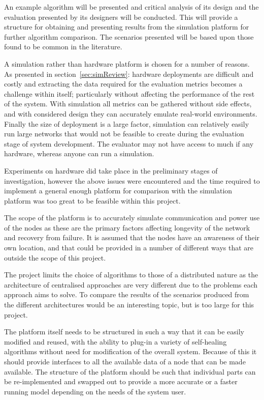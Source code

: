 \documentclass[authoryearcitations]{UoYCSproject}
\begin{document}
An example algorithm will be presented and critical analysis of its design and the evaluation presented by its designers will be conducted. This will provide a structure for obtaining and presenting results from the simulation platform for further algorithm comparison. The scenarios presented will be based upon those found to be common in the literature.

A simulation rather than hardware platform is chosen for a number of reasons. As presented in section~\ref{sec:simReview}: hardware deployments are difficult and costly and extracting the data required for the evaluation metrics becomes a challenge within itself; particularly without affecting the performance of the rest of the system. With simulation all metrics can be gathered without side effects, and with considered design they can accurately emulate real-world environments. Finally the size of deployment is a large factor, simulation can relatively easily run large networks that would not be feasible to create during the evaluation stage of system development. The evaluator may not have access to much if any hardware, whereas anyone can run a simulation.

Experiments on hardware did take place in the preliminary stages of investigation, however the above issues were encountered and the time required to implement a general enough platform for comparison with the simulation platform was too great to be feasible within this project.

The scope of the platform is to accurately simulate communication and power use of the nodes as these are the primary factors affecting longevity of the network and recovery from failure. It is assumed that the nodes have an awareness of their own location, and that could be provided in a number of different ways that are outside the scope of this project.

The project limits the choice of algorithms to those of a distributed nature as the architecture of centralised approaches are very different due to the problems each approach aims to solve. To compare the results of the scenarios produced from the different architectures would be an interesting topic, but is too large for this project.

The platform itself needs to be structured in such a way that it can be easily modified and reused, with the ability to plug-in a variety of self-healing algorithms without need for modification of the overall system. Because of this it should provide interfaces to all the available data of a node that can be made available. The structure of the platform should be such that individual parts can be re-implemented and swapped out to provide a more accurate or a faster running model depending on the needs of the system user.
\end{document}
